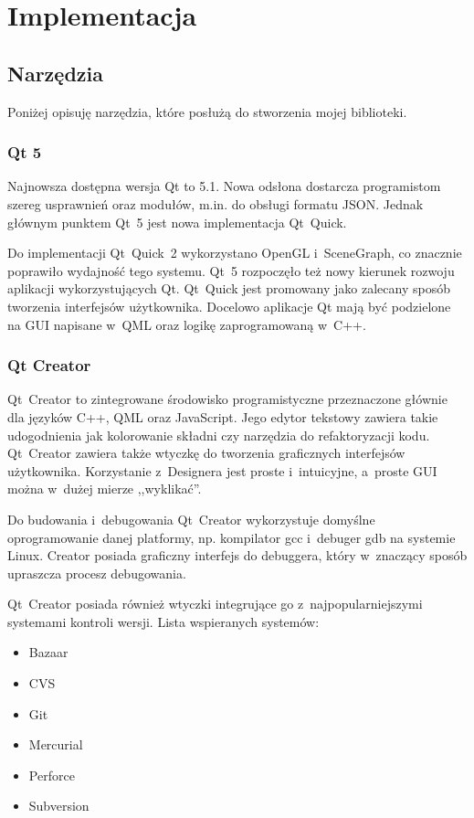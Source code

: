 \chapter{Implementacja}

\section{Narzędzia}
Poniżej opisuję narzędzia, które posłużą do stworzenia mojej biblioteki.

\subsection{Qt 5}
Najnowsza dostępna wersja Qt to 5.1. Nowa odsłona dostarcza programistom szereg usprawnień oraz modułów, m.in. do obsługi formatu JSON. Jednak głównym punktem Qt~5 jest nowa implementacja Qt~Quick. 

Do implementacji Qt~Quick~2 wykorzystano OpenGL i~SceneGraph, co znacznie poprawiło wydajność tego systemu. Qt~5 rozpoczęło też nowy kierunek rozwoju aplikacji wykorzystujących Qt. Qt~Quick jest promowany jako zalecany sposób tworzenia interfejsów użytkownika. Docelowo aplikacje Qt mają być podzielone na GUI napisane w~QML oraz logikę zaprogramowaną w~C++.

\subsection{Qt Creator}
Qt~Creator to zintegrowane środowisko programistyczne przeznaczone głównie dla języków C++, QML oraz JavaScript. Jego edytor tekstowy zawiera takie udogodnienia jak kolorowanie składni czy narzędzia do refaktoryzacji kodu. Qt~Creator zawiera także wtyczkę do tworzenia graficznych interfejsów użytkownika. Korzystanie z~Designera jest proste i~intuicyjne, a~proste GUI można w~dużej mierze ,,wyklikać''.

Do budowania i~debugowania Qt~Creator wykorzystuje domyślne oprogramowanie danej platformy, np. kompilator gcc i~debuger gdb na systemie Linux. Creator posiada graficzny interfejs do debuggera, który w~znaczący sposób upraszcza procesz debugowania.

Qt~Creator posiada również wtyczki integrujące go z~najpopularniejszymi systemami kontroli wersji. Lista wspieranych systemów:
\begin{itemize}
\item{Bazaar}
\item{CVS}
\item{Git}
\item{Mercurial}
\item{Perforce}
\item{Subversion}
\end{itemize}

